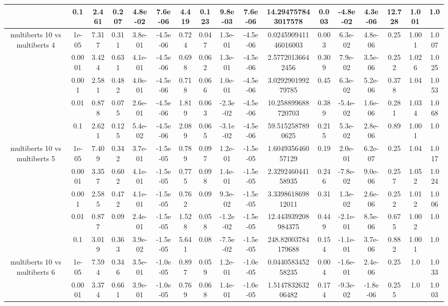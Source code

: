 \begin{tabular}{|c|c|c|c|c|c|c|c|c|c|c|c|c|c|c|c|c|}
 & 0.1 & 2.461 & 0.207 & 4.8e-02 & 7.6e-06 & 4.419 & 0.123 & 9.8e-03 & 7.6e-06 & 14.294757843017578 & 0.003 & -4.8e-02 & 4.3e-06 & 12.728 & 1.001 & 1.0 \\
\hline
\multirow{5}{*}{multiberts 10 vs multiberts 4} & 1e-05 & 7.317 & 0.311 & 3.8e-01 & -4.5e-06 & 0.724 & 0.047 & 1.3e-01 & -4.5e-06 & 0.024590941146016003 & 0.003 & 6.3e-02 & 4.8e-06 & 0.25 & 1.001 & 1.007 \\
 & 0.0001 & 3.424 & 0.631 & 4.1e-01 & -4.5e-06 & 0.698 & 0.062 & 1.3e-01 & -4.5e-06 & 2.57720136642456 & 0.309 & 7.9e-02 & 3.5e-06 & 0.252 & 1.026 & 1.025 \\
 & 0.001 & 2.581 & 0.482 & 4.0e-01 & -4.5e-06 & 0.718 & 0.066 & 1.0e-01 & -4.5e-06 & 3.029290199279785 & 0.45 & 6.3e-02 & 5.2e-06 & 0.378 & 1.04 & 1.053 \\
 & 0.01 & 0.878 & 0.075 & 2.6e-01 & -4.5e-06 & 1.819 & 0.063 & -2.3e-02 & -4.5e-06 & 10.258899688720703 & 0.389 & -5.4e-02 & 1.6e-06 & 0.281 & 1.034 & 1.068 \\
 & 0.1 & 2.621 & 0.125 & 5.4e-02 & -4.5e-06 & 2.089 & 0.065 & -3.1e-02 & -4.5e-06 & 59.5152587890625 & 0.215 & 5.3e-02 & 2.8e-06 & 0.89 & 1.001 & 1.0 \\
\hline
\multirow{5}{*}{multiberts 10 vs multiberts 5} & 1e-05 & 7.409 & 0.342 & 3.7e-01 & -1.5e-05 & 0.789 & 0.097 & 1.2e-01 & -1.5e-05 & 1.604935646057129 & 0.19 & 2.0e-01 & 6.2e-07 & 0.25 & 1.04 & 1.017 \\
 & 0.0001 & 3.357 & 0.602 & 4.1e-01 & -1.5e-05 & 0.775 & 0.098 & 1.4e-01 & -1.5e-05 & 2.329246044158935 & 0.246 & -7.8e-02 & 9.0e-06 & 0.257 & 1.052 & 1.024 \\
 & 0.001 & 2.585 & 0.472 & 4.1e-01 & -1.5e-05 & 0.762 & 0.09 & 9.3e-02 & -1.5e-05 & 3.339861869812011 & 0.31 & 1.3e-02 & 2.6e-06 & 0.252 & 1.012 & 1.006 \\
 & 0.01 & 0.877 & 0.09 & 2.4e-01 & -1.5e-05 & 1.528 & 0.058 & -1.2e-02 & -1.5e-05 & 12.443939208984375 & 0.449 & -2.1e-01 & 8.5e-06 & 0.675 & 1.002 & 1.0 \\
 & 0.1 & 3.019 & 0.363 & 3.9e-02 & -1.5e-05 & 5.641 & 0.08 & -7.5e-02 & -1.5e-05 & 248.82003784179688 & 0.154 & -1.1e-01 & 3.7e-06 & 0.882 & 1.001 & 1.0 \\
\hline
\multirow{5}{*}{multiberts 10 vs multiberts 6} & 1e-05 & 7.594 & 0.346 & 3.5e-01 & -1.0e-05 & 0.897 & 0.059 & 1.2e-01 & -1.0e-05 & 0.044058345258235 & 0.004 & -1.6e-01 & 2.4e-06 & 0.25 & 1.0 & 1.033 \\
 & 0.0001 & 3.374 & 0.661 & 3.9e-01 & -1.0e-05 & 0.769 & 0.068 & 1.4e-01 & -1.0e-05 & 1.514783263206482 & 0.174 & -9.3e-02 & -1.8e-06 & 0.255 & 1.0 & 1.003 \\

\end{tabular}
